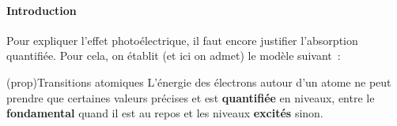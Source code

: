 \documentclass[../../main/main.tex]{subfiles}
\begin{document}
\paragraph*{Introduction}
Pour expliquer l'effet photoélectrique, il faut encore justifier l'absorption
quantifiée. Pour cela, on établit (et ici on admet) le modèle suivant~:
\begin{tcb*}[sidebyside, righthand ratio=.35](prop){Transitions atomiques}
	L'énergie des électrons autour d'un atome ne peut prendre que certaines
	valeurs précises et est \textbf{quantifiée} en niveaux, entre le
	\textbf{fondamental} quand il est au repos et les niveaux \textbf{excités}
	sinon.
	\tcblower
	\begin{center}
	\end{center}
\end{tcb*}
\end{document}
